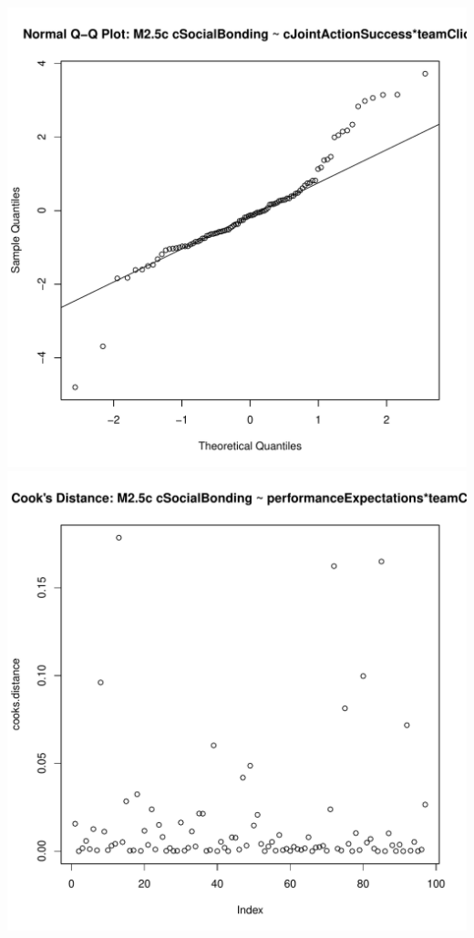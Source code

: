 \documentclass[12pt]{report}
\begin{document}
\includegraphics[scale =.4]{../images/MLM25cQQNorm.pdf}
\includegraphics[scale =.4]{../images/MLM25cCooksD.pdf}
\end{document}
